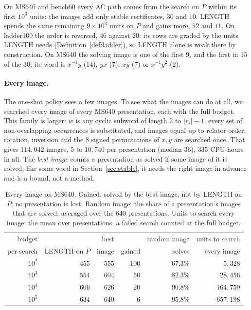 On MS640 and bench60 every AC path comes from the search on $P$ within its first $10^3$ units: the images add only
stable certificates, $30$ and $10$. LENGTH spends the same remaining $9\times10^3$ units on $P$ and gains more, $52$
and $11$. On ladder100 the order is reversed, $46$ against $20$: its rows are graded by the units LENGTH needs
(Definition~\ref{def:ladder}), so LENGTH alone is weak there by construction. On MS640 the solving image is one of the
first $9$, and the first in $15$ of the $30$; its word is $x^{-1}y$ ($14$), $yx$ ($7$), $xy$ ($7$) or $x^{-1}y^{2}$
($2$).

\paragraph{Every image.} The one-shot policy sees a few images. To see what the images can do at all, we searched every
image of every MS640 presentation, each with the full budget. This family is larger: $w$ is any cyclic subword of
length $2$ to $|r_i|-1$, every set of non-overlapping occurrences is substituted, and images equal up to relator order,
rotation, inversion and the $8$ signed permutations of $x,y$ are searched once. That gives $114{,}042$ images, $5$ to
$10{,}740$ per presentation (median $36$), $335$ CPU-hours in all. The \emph{best image} counts a presentation as
solved if some image of it is solved; like some word in Section~\ref{sec:stable}, it needs the right image in advance
and is a bound, not a method.

\begin{table}[ht]
\centering
\small
\begin{tabular}{rrrrrr}
\toprule
budget & & best & & random image & units to search\\
per search & LENGTH on $P$ & image & gained & solves & every image\\
\midrule
$10^2$ & $455$ & $555$ & $100$ & $67.3\%$ & $5{,}328$\\
$10^3$ & $554$ & $604$ & $50$ & $82.3\%$ & $28{,}456$\\
$10^4$ & $606$ & $626$ & $20$ & $90.8\%$ & $164{,}759$\\
$10^5$ & $634$ & $640$ & $6$ & $95.8\%$ & $657{,}198$\\
\bottomrule
\end{tabular}
\caption{Every image on MS640. Gained: solved by the best image, not by LENGTH on $P$; no presentation is lost.
Random image: the share of a presentation's images that are solved, averaged over the $640$ presentations. Units to
search every image: the mean over presentations, a failed search counted at the full budget.}
\label{tab:cov_all}
\end{table}

